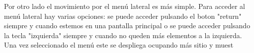 Por otro lado el movimiento por el menú lateral es más simple. Para acceder al menú lateral hay varias opciones: se puede acceder pulsando el boton "return" siempre y 
cuando estemos en una pantalla principal o se puede acceder pulsando la tecla "izquierda" siempre y cuando no queden más elementos a la izquierda. Una vez seleccionado
el menú este se despliega ocupando más sitio y muest